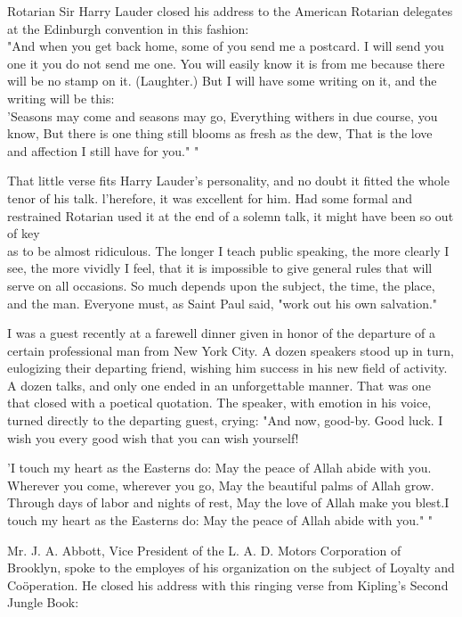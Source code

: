 \documentclass[10pt]{article}
\begin{document}
Rotarian Sir Harry Lauder closed his address to the American Rotarian delegates at the Edinburgh convention in this fashion:\\
"And when you get back home, some of you send me a postcard. I will send you one it you do not send me one. You will easily know it is from me because there will be no stamp on it. (Laughter.) But I will have some writing on it, and the writing will be this:\\
'Seasons may come and seasons may go, Everything withers in due course, you know, But there is one thing still blooms as fresh as the dew, That is the love and affection I still have for you." "

That little verse fits Harry Lauder's personality, and no doubt it fitted the whole tenor of his talk. l'herefore, it was excellent for him. Had some formal and restrained Rotarian used it at the end of a solemn talk, it might have been so out of key\\
as to be almost ridiculous. The longer I teach public speaking, the more clearly I see, the more vividly I feel, that it is impossible to give general rules that will serve on all occasions. So much depends upon the subject, the time, the place, and the man. Everyone must, as Saint Paul said, "work out his own salvation."

I was a guest recently at a farewell dinner given in honor of the departure of a certain professional man from New York City. A dozen speakers stood up in turn, eulogizing their departing friend, wishing him success in his new field of activity. A dozen talks, and only one ended in an unforgettable manner. That was one that closed with a poetical quotation. The speaker, with emotion in his voice, turned directly to the departing guest, crying: "And now, good-by. Good luck. I wish you every good wish that you can wish yourself!

\begin{displayquote}
'I touch my heart as the Easterns do: May the peace of Allah abide with you. Wherever you come, wherever you go, May the beautiful palms of Allah grow. Through days of labor and nights of rest, May the love of Allah make you blest.I touch my heart as the Easterns do: May the peace of Allah abide with you." "
\end{displayquote}

Mr. J. A. Abbott, Vice President of the L. A. D. Motors Corporation of Brooklyn, spoke to the employes of his organization on the subject of Loyalty and Coöperation. He closed his address with this ringing verse from Kipling's Second Jungle Book:
\end{document}
